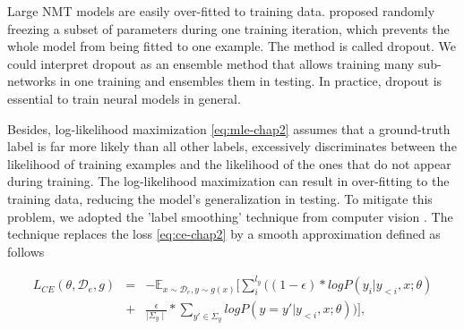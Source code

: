 Large NMT models are easily over-fitted to training data. \citet{Srivastava14Dropout} proposed randomly freezing a subset of parameters during one training iteration, which prevents the whole model from being fitted to one example. The method is called dropout. We could interpret dropout as an ensemble method that allows training many sub-networks in one training and ensembles them in testing. In practice, dropout is essential to train neural models in general. 

Besides, log-likelihood maximization \eqref{eq:mle-chap2} assumes that a ground-truth label is far more likely than all other labels, excessively discriminates between the likelihood of training examples and the likelihood of the ones that do not appear during training. The log-likelihood maximization can result in over-fitting to the training data, reducing the model's generalization in testing. To mitigate this problem, we adopted the 'label smoothing' technique from computer vision \citet{Szegedy16rethinking}. The technique replaces the loss \eqref{eq:ce-chap2} by a smooth approximation defined as follows

\begin{equation}
\begin{array}{rcl}
L_{CE}(\theta, \mathcal{D}_e, g) &=& -\displaystyle{ \mathbb{E}_{x \sim \mathcal{D}_e, y \sim g(x)}} \bigg[ \displaystyle{\mathop{\sum}_{i}^{l_y}} \big( (1-\epsilon) * log P(y_i|y_{<i},x;\theta) \\
	&+& \frac{\epsilon}{\mid \Sigma_y \mid} * \displaystyle{\mathop{\sum}_{y' \in \Sigma_y}} log P(y = y'|y_{<i},x;\theta)\big) \bigg], \\
\end{array}
\end{equation}

